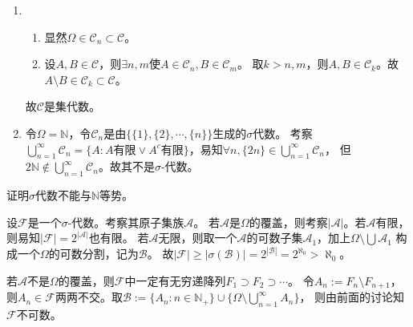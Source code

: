 \documentclass{ctexart}
\begin{document}
\begin{solution}
  \begin{enumerate}
    \item
      \begin{enumerate}
        \item 显然\(\Omega \in \mathcal{C}_n \subset \mathcal{C} \)。
        \item 设\(A,B \in \mathcal{C} \)，则\(\exists n,m \)使\(A \in \mathcal{C}_n,B \in \mathcal{C}_m \)。
          取\(k >n,m \)，则\(A,B \in \mathcal{C}_k \)。故\(A \setminus B \in \mathcal{C}_k \subset \mathcal{C} \)。
      \end{enumerate}
      故\(\mathcal{C} \)是集代数。
    \item 令\(\Omega=\mathbb{N} \)，令\(\mathcal{C}_n \)是由\(\{\{1\},\{2\},\cdots,\{n\}\} \)生成的\(\sigma \)代数。
      考察\(\bigcup_{n=1}^{\infty}\mathcal{C}_n =\{A:A \text{有限} \vee A^c \text{有限}\}\)，易知\(\forall n,\{2n\} \in \bigcup_{n=1}^{\infty}\mathcal{C}_n \)，
      但\(2 \mathbb{N} \notin \bigcup_{n=1}^{\infty}\mathcal{C}_n \)。故其不是\(\sigma \)-代数。
  \end{enumerate}
\end{solution}

\begin{problem}\label{pro:1.4.6}
  证明\(\sigma \)代数不能与\(\mathbb{N} \)等势。
\end{problem}
\begin{solution}
  设\(\mathcal{F} \)是一个\(\sigma \)-代数。考察其原子集族\(\mathcal{A} \)。
  若\(\mathcal{A} \)是\(\Omega \)的覆盖，则考察\(|\mathcal{A}| \)。若\(\mathcal{A} \)有限，则易知\(|\mathcal{F}|=2^{|\mathcal{A}|} \)也有限。
  若\(\mathcal{A} \)无限，则取一个\(\mathcal{A} \)的可数子集\(\mathcal{A}_1 \)，加上\(\Omega \setminus \bigcup \mathcal{A}_1\) 构成一个\(\Omega \)的可数分割，记为\(\mathcal{B} \)。
  故\(|\mathcal{F}|\geq |\sigma(\mathcal{B})|=2^{|\mathcal{B}|}=2^{\aleph_0}>\aleph_0 \)。

  若\(\mathcal{A} \)不是\(\Omega \)的覆盖，则\(\mathcal{F} \)中一定有无穷递降列\(F_1 \supset F_2 \supset \cdots \)。
  令\(A_n :=F_n \setminus F_{n+1} \)，则\(A_n \in \mathcal{F} \)两两不交。取\(\mathcal{B}:=\{A_n:n \in \mathbb{N}_{+}\} \cup \{\Omega \setminus \bigcup_{n=1}^{\infty}A_n\} \)，
  则由前面的讨论知\(\mathcal{F} \)不可数。
\end{solution}
\end{document}
